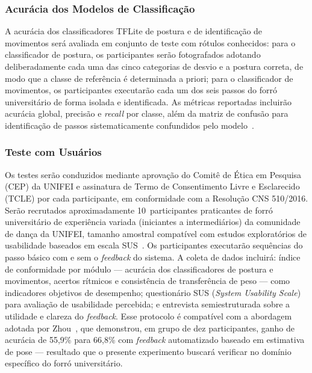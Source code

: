 \subsubsection{Acurácia dos Modelos de Classificação}
A acurácia dos classificadores TFLite de postura e de identificação de movimentos será
avaliada em conjunto de teste com rótulos conhecidos: para o classificador de postura,
os participantes serão fotografados adotando deliberadamente cada uma das cinco categorias
de desvio e a postura correta, de modo que a classe de referência é determinada a priori;
para o classificador de movimentos, os participantes executarão cada um dos seis passos
do forró universitário de forma isolada e identificada. As métricas reportadas incluirão
acurácia global, precisão e \textit{recall} por classe, além da matriz de confusão para
identificação de passos sistematicamente confundidos pelo
modelo~\cite{roggio2024pose, bursa2023tflite}.

\subsubsection{Teste com Usuários}
Os testes serão conduzidos mediante aprovação do Comitê de Ética em Pesquisa (CEP) da
UNIFEI e assinatura de Termo de Consentimento Livre e Esclarecido (TCLE) por cada
participante, em conformidade com a Resolução CNS 510/2016. Serão recrutados aproximadamente 10~participantes praticantes de forró universitário
de experiência variada (iniciantes a intermediários) da comunidade de dança da UNIFEI,
tamanho amostral compatível com estudos exploratórios de usabilidade baseados em
escala SUS~\cite{stanford_ai_dance_coaching}. Os participantes
executarão sequências do passo básico com e sem o \textit{feedback} do sistema. A coleta de
dados incluirá: índice de conformidade por módulo --- acurácia dos classificadores de postura
e movimentos, acertos rítmicos e consistência de transferência de peso --- como indicadores
objetivos de desempenho; questionário SUS (\textit{System Usability Scale}) para avaliação de usabilidade
percebida; e entrevista semiestruturada sobre a utilidade e clareza do \textit{feedback}.
Esse protocolo é compatível com a abordagem adotada por Zhou~\cite{stanford_ai_dance_coaching},
que demonstrou, em grupo de dez participantes, ganho de acurácia de 55,9\% para 66,8\% com
\textit{feedback} automatizado baseado em estimativa de pose --- resultado que o presente
experimento buscará verificar no domínio específico do forró universitário.
